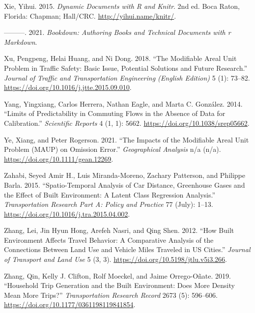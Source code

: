 \documentclass[
  11pt,
  openany]{memoir}
\newlength{\cslhangindent}
\newlength{\cslentryspacingunit} %
\newenvironment{CSLReferences}[2] %
 {%
  \setlength{\parindent}{0pt}
  \ifodd #1
  \let\oldpar\par
  \def\par{\hangindent=\cslhangindent\oldpar}
  \fi
  \setlength{\parskip}{#2\cslentryspacingunit}
 }%
 {}
\begin{document}
\begin{CSLReferences}{1}{0}
\leavevmode{}%
Xie, Yihui. 2015. \emph{Dynamic Documents with {R} and Knitr}. 2nd ed. Boca Raton, Florida: Chapman; Hall/CRC. \url{http://yihui.name/knitr/}.

\leavevmode{}%
---------. 2021. \emph{Bookdown: Authoring Books and Technical Documents with r Markdown}.

\leavevmode{}%
Xu, Pengpeng, Helai Huang, and Ni Dong. 2018. {``The Modifiable Areal Unit Problem in Traffic Safety: Basic Issue, Potential Solutions and Future Research.''} \emph{Journal of Traffic and Transportation Engineering (English Edition)} 5 (1): 73--82. \url{https://doi.org/10.1016/j.jtte.2015.09.010}.

\leavevmode{}%
Yang, Yingxiang, Carlos Herrera, Nathan Eagle, and Marta C. González. 2014. {``Limits of {Predictability} in {Commuting Flows} in the {Absence} of {Data} for {Calibration}.''} \emph{Scientific Reports} 4 (1, 1): 5662. \url{https://doi.org/10.1038/srep05662}.

\leavevmode{}%
Ye, Xiang, and Peter Rogerson. 2021. {``The {Impacts} of the {Modifiable Areal Unit Problem} ({MAUP}) on {Omission Error}.''} \emph{Geographical Analysis} n/a (n/a). \url{https://doi.org/10.1111/gean.12269}.

\leavevmode{}%
Zahabi, Seyed Amir H., Luis Miranda-Moreno, Zachary Patterson, and Philippe Barla. 2015. {``Spatio-Temporal Analysis of Car Distance, Greenhouse Gases and the Effect of Built Environment: A Latent Class Regression Analysis.''} \emph{Transportation Research Part A: Policy and Practice} 77 (July): 1--13. \url{https://doi.org/10.1016/j.tra.2015.04.002}.

\leavevmode{}%
Zhang, Lei, Jin Hyun Hong, Arefeh Nasri, and Qing Shen. 2012. {``How Built Environment Affects Travel Behavior: A Comparative Analysis of the Connections Between Land Use and Vehicle Miles Traveled in {US} Cities.''} \emph{Journal of Transport and Land Use} 5 (3, 3). \url{https://doi.org/10.5198/jtlu.v5i3.266}.

\leavevmode{}%
Zhang, Qin, Kelly J. Clifton, Rolf Moeckel, and Jaime Orrego-Oñate. 2019. {``Household {Trip Generation} and the {Built Environment}: Does {More Density Mean More Trips}?''} \emph{Transportation Research Record} 2673 (5): 596--606. \url{https://doi.org/10.1177/0361198119841854}.


\end{CSLReferences}
\end{document}
